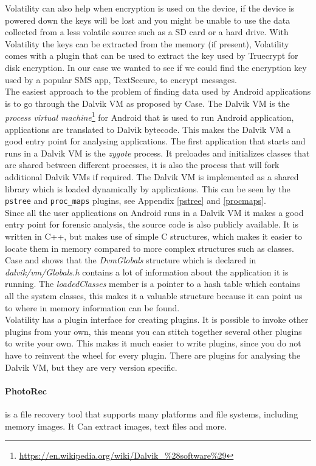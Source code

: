   Volatility can also help when encryption is used on the device, if the device is
  powered down the keys will be lost and you might be unable to use the data 
  collected from a less volatile source such as a SD card or a hard drive. With
  Volatility the keys can be extracted from the memory (if present), Volatility 
  comes with a plugin that can be used to extract the key used by Truecrypt for 
  disk encryption. In our case we wanted to see if we could find the encryption
  key used by a popular SMS app, TextSecure, to encrypt messages.\\
  
  The easiest approach to the problem of finding data used by Android
  applications is to go through the Dalvik VM as proposed by Case\cite{case2011}.
  The Dalvik VM is the \textit{process virtual
  machine}\footnote{\url{https://en.wikipedia.org/wiki/Dalvik\_\%28software\%29}} for
  Android that is used to run Android application, applications are translated to
  Dalvik bytecode. This makes the Dalvik VM a good entry point for analysing
  applications. The first application that starts and runs in a Dalvik VM is the
  \textit{zygote} process. It preloades and initializes classes that are shared
  between different processes, it is also the process that will fork additional
  Dalvik VMs if required. The Dalvik VM is implemented as a shared library which
  is loaded dynamically by applications. This can be seen by the \texttt{pstree} and
  \texttt{proc\_maps} plugins, see Appendix \ref{pstree} and \ref{procmaps}. \\

  Since all the user applications on Android runs in a Dalvik VM it makes a good entry
  point for forensic analysis, the source code is also publicly available. It is
  written in C++, but makes use of simple C structures, which makes it easier to
  locate them in memory compared to more complex structures such as classes. Case
  and \cite{holger} shows that the \textit{DvmGlobals} structure which is
  declared in \textit{dalvik/vm/Globals.h} contains a lot of information about
  the application it is running. The \textit{loadedClasses} member is a pointer
  to a hash table which contains all the system classes, this makes it a
  valuable structure because it can point us to where in memory information can
  be found.\\

  Volatility has a plugin interface for creating plugins. It is possible to
  invoke other plugins from your own, this means you can stitch together
  several other plugins to write your own. This makes it much easier to write
  plugins, since you do not have to reinvent the wheel for every plugin. There
  are plugins for analysing the Dalvik VM, but they are very version specific.

  \paragraph{PhotoRec} is a file recovery tool that supports many platforms and file systems, including memory images. 
  It Can extract images, text files and more. %

